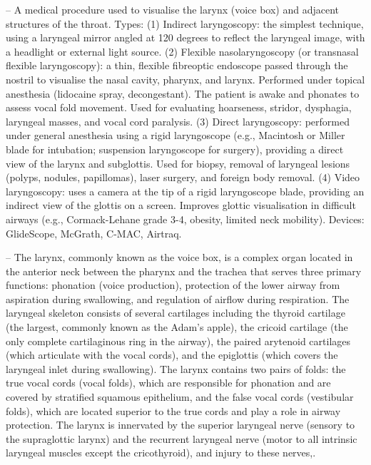 -- A medical procedure used to visualise the larynx (voice box) and adjacent structures of the throat. Types: (1) Indirect laryngoscopy: the simplest technique, using a laryngeal mirror angled at 120 degrees to reflect the laryngeal image, with a headlight or external light source. (2) Flexible nasolaryngoscopy (or transnasal flexible laryngoscopy): a thin, flexible fibreoptic endoscope passed through the nostril to visualise the nasal cavity, pharynx, and larynx. Performed under topical anesthesia (lidocaine spray, decongestant). The patient is awake and phonates to assess vocal fold movement. Used for evaluating hoarseness, stridor, dysphagia, laryngeal masses, and vocal cord paralysis. (3) Direct laryngoscopy: performed under general anesthesia using a rigid laryngoscope (e.g., Macintosh or Miller blade for intubation; suspension laryngoscope for surgery), providing a direct view of the larynx and subglottis. Used for biopsy, removal of laryngeal lesions (polyps, nodules, papillomas), laser surgery, and foreign body removal. (4) Video laryngoscopy: uses a camera at the tip of a rigid laryngoscope blade, providing an indirect view of the glottis on a screen. Improves glottic visualisation in difficult airways (e.g., Cormack-Lehane grade 3-4, obesity, limited neck mobility). Devices: GlideScope, McGrath, C-MAC, Airtraq.

-- The larynx, commonly known as the voice box, is a complex organ located in the anterior neck between the pharynx and the trachea that serves three primary functions: phonation (voice production), protection of the lower airway from aspiration during swallowing, and regulation of airflow during respiration. The laryngeal skeleton consists of several cartilages including the thyroid cartilage (the largest, commonly known as the Adam’s apple), the cricoid cartilage (the only complete cartilaginous ring in the airway), the paired arytenoid cartilages (which articulate with the vocal cords), and the epiglottis (which covers the laryngeal inlet during swallowing). The larynx contains two pairs of folds: the true vocal cords (vocal folds), which are responsible for phonation and are covered by stratified squamous epithelium, and the false vocal cords (vestibular folds), which are located superior to the true cords and play a role in airway protection. The larynx is innervated by the superior laryngeal nerve (sensory to the supraglottic larynx) and the recurrent laryngeal nerve (motor to all intrinsic laryngeal muscles except the cricothyroid), and injury to these nerves,.

